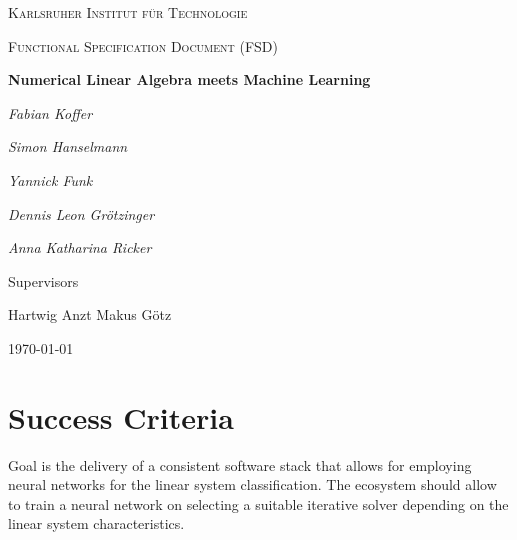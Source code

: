 \documentclass[parskip=full]{scrartcl}
\begin{document}
\begin{titlepage}
\centering
{\scshape\LARGE Karlsruher Institut für Technologie\par}
\vspace{1cm}
{\scshape\Large Functional Specification Document (FSD)\par}
\vspace{1.5cm}
{\huge\bfseries Numerical Linear Algebra meets Machine Learning \par}
\vspace {2cm}

{\Large\itshape Fabian Koffer\par}
{\Large\itshape Simon Hanselmann\par}
{\Large\itshape Yannick Funk\par}
{\Large\itshape Dennis Leon Gr\"{o}tzinger\par}
{\Large\itshape Anna Katharina Ricker\par}

\vfill
Supervisors\par
Hartwig Anzt
Makus G\"{o}tz

\vfill
{\large\today\par}
\end{titlepage}



\section{Success Criteria}

Goal is the delivery of a consistent software stack that allows for employing 
\glspl{neural network} for the linear system \gls{classification}. 
The ecosystem should allow to train a \gls{neural network} on selecting a suitable \gls{iterative solver} depending on the linear system characteristics.
\end{document}
